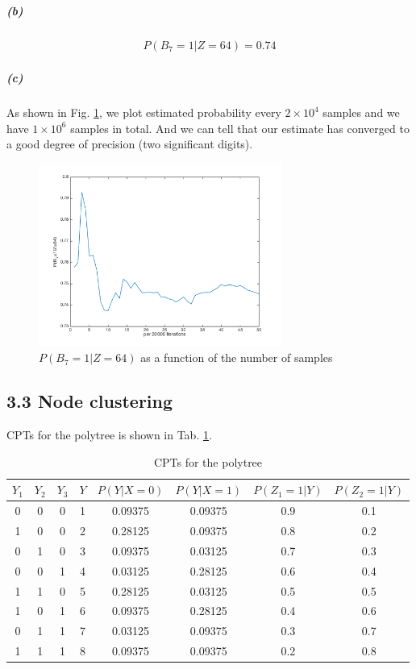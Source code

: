 \documentclass{article}
\begin{document}
\subparagraph*{(b)}
\begin{eqnarray*}
P (B_7 = 1|Z = 64) = 0.74
\end{eqnarray*}

\subparagraph*{(c)}
As shown in Fig. \ref{3.2c}, we plot estimated probability every $2\times10^4$ samples and we have $1\times10^6$ samples in total. And we can tell that our estimate has converged to a good degree of precision (two significant digits).
\begin{figure}[h]
	\centering
	\includegraphics[width=8cm]{3.2c.png}
	\caption{$P (B_7 = 1|Z = 64)$ as a function of the number of samples}
	\label{3.2c}
\end{figure}

\subsection*{3.3 Node clustering}
CPTs for the polytree is shown in Tab. \ref{3.3}.
\begin{table}[h]
	\centering
	\begin{tabular}{|c|c|c|c|c|c|c|c|}
		\hline
		$Y_1$ & $Y_2$ & $Y_3$ & $Y$ & $P(Y|X=0)$ & $P(Y|X=1)$ & $P(Z_1=1|Y)$ & $P(Z_2=1|Y)$ \\
		\hline
		0 & 0 & 0 & 1 & 0.09375 & 0.09375 & 0.9 & 0.1\\
		\hline
		1 & 0 & 0 & 2 & 0.28125 & 0.09375 & 0.8 & 0.2\\
		\hline
		0 & 1 & 0 & 3 & 0.09375 & 0.03125 & 0.7 & 0.3\\
		\hline
		0 & 0 & 1 & 4 & 0.03125 & 0.28125 & 0.6 & 0.4\\
		\hline
		1 & 1 & 0 & 5 & 0.28125 & 0.03125 & 0.5 & 0.5\\
		\hline
		1 & 0 & 1 & 6 & 0.09375 & 0.28125 & 0.4 & 0.6\\
		\hline
		0 & 1 & 1 & 7 & 0.03125 & 0.09375 & 0.3 & 0.7\\
		\hline
		1 & 1 & 1 & 8 & 0.09375 & 0.09375 & 0.2 & 0.8\\
		\hline
	\end{tabular}
	\caption{CPTs for the polytree}
	\label{3.3}
\end{table}
\end{document}
